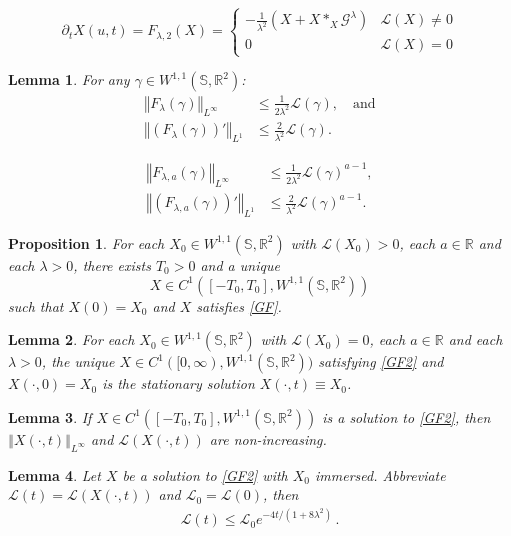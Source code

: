 \documentclass[10pt,a4paper]{amsart}
\newtheorem{lemma}{Lemma}
\newtheorem{proposition}{Proposition}
\def\R{\mathbb{R}}
\def\S{\mathbb{S}}
\def\length{\mathcal L}
\newcommand{\norm}[1]{{\left \Vert {#1}\right \Vert}}
\begin{document}
\begin{equation}\label{GF2}\tag{GF2}
\partial_t X(u,t)=F_{\lambda,2}(X)=
\begin{cases}
-\frac{1}{ \lambda^2} \left (X+X\ast_X\mathcal{G}^\lambda \right ) & \length(X)\neq 0 \\
0 & \length(X)=0
\end{cases}
\end{equation}

\begin{lemma}\label{bounds}
For any $\gamma\in W^{1,1}(\S,\R^2)$:
\begin{align}\label{Fest1}
\norm{F_\lambda(\gamma)}_{L^\infty}& \leq \frac{1}{2\lambda^2 }\length(\gamma), \quad \text{and} \\ 
\norm{(F_\lambda(\gamma))'}_{L^1}&\leq \frac{2}{\lambda^2}\length(\gamma).  \label{Fdest}
\end{align}
\end{lemma}

\begin{align}\label{Fa-est1}
\norm{F_{\lambda,a}(\gamma)}_{L^\infty}&\leq \frac{1}{2\lambda^2}\length(\gamma)^{a-1},\\
\label{Fa-est2}
\norm{(F_{\lambda,a}(\gamma))'}_{L^1}&\leq \frac{2}{\lambda^2}\length(\gamma)^{a-1}.
\end{align}

\begin{proposition}\label{existence}
For each $X_0\in W^{1,1}(\S,\R^2)$ with $\length(X_0)>0$, each $a\in\R$ and each $\lambda>0$, there exists $T_0>0$ and a unique
\[
X\in C^1([-T_0,T_0],W^{1,1}(\S,\R^2))
\]
such that $X(0)=X_0$ and $X$ satisfies \eqref{GF}.
\end{proposition}

\begin{lemma}\label{wellposedconstants}
For each $X_0\in W^{1,1}(\S,\R^2)$ with $\length(X_0)=0$, each $a\in\R$ and each $\lambda>0$, the unique $X\in C^1([0,\infty),W^{1,1}(\S,\R^2))$ satisfying \eqref{GF2} and $X(\cdot,0)= X_0$ is the stationary solution $X(\cdot, t)\equiv X_0$.
\end{lemma}

\begin{lemma}\label{apriori}
If $X\in C^1([-T_0,T_0],W^{1,1}(\S,\R^2))$ is a solution to \eqref{GF2}, then $\norm{X(\cdot, t)}_{L^\infty}$ and $\length(X(\cdot,t))$ are non-increasing. 
\end{lemma}

\begin{lemma} \label{lengthdecay}
Let $X$ be a solution to \eqref{GF2} with $X_0$ immersed. Abbreviate $\mathcal L (t)=\mathcal L(X(\cdot,t))$ and $\mathcal L_0=\mathcal L(0)$, then
\begin{align}\label{eq:ldecay}
\length(t)\leq \length_0 e^{-4t/(1+8\lambda^2)}
\,.
\end{align}
\end{lemma}
\end{document}

